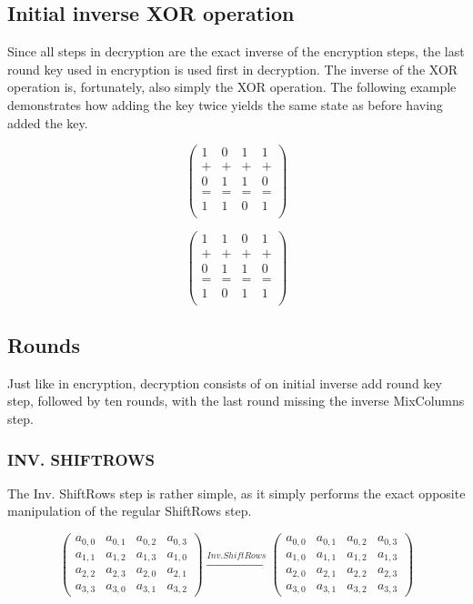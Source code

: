 \documentclass[12pt]{report}
\theoremstyle{definition}
\theoremstyle{remark}
\begin{document}
\subsection{Initial inverse XOR operation}
Since all steps in decryption are the exact inverse of the encryption steps, the last round key used in encryption is used first in decryption\cite{RoundKeyInverse}. The inverse of the XOR operation is, fortunately, also simply the XOR operation. The following example demonstrates how adding the key twice yields the same state as before having added the key.

\[
\left( \begin{array}{cccc}
1 & 0 & 1 & 1 \\
+ & + & + & + \\
0 & 1 & 1 & 0 \\
= & = & = & = \\
1 & 1 & 0 & 1 \\
\end{array} \right)
\]

\[
\left( \begin{array}{cccc}
1 & 1 & 0 & 1 \\
+ & + & + & + \\
0 & 1 & 1 & 0 \\
= & = & = & = \\
1 & 0 & 1 & 1 \\
\end{array} \right)
\]

\subsection{Rounds}
Just like in encryption, decryption consists of on initial inverse add round key step, followed by ten rounds, with the last round missing the inverse MixColumns step.

\subsubsection{INV. SHIFTROWS}
The Inv. ShiftRows step is rather simple, as it simply performs the exact opposite manipulation of the regular ShiftRows step.

\[
\left( \begin{array}{cccc}
a_{0,0} & a_{0,1} & a_{0,2} & a_{0,3} \\
a_{1,1} & a_{1,2} & a_{1,3} & a_{1,0} \\
a_{2,2} & a_{2,3} & a_{2,0} & a_{2,1} \\
a_{3,3} & a_{3,0} & a_{3,1} & a_{3,2}\end{array} \right)
\xrightarrow{Inv. ShiftRows}
\left( \begin{array}{cccc}
a_{0,0} & a_{0,1} & a_{0,2} & a_{0,3} \\
a_{1,0} & a_{1,1} & a_{1,2} & a_{1,3} \\
a_{2,0} & a_{2,1} & a_{2,2} & a_{2,3} \\
a_{3,0} & a_{3,1} & a_{3,2} & a_{3,3}\end{array} \right)
\]
\end{document}

